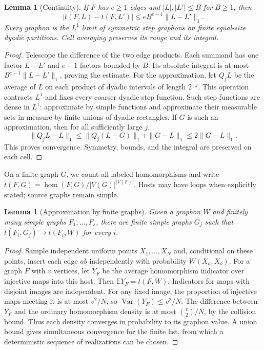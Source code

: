 \documentclass[11pt,a4paper]{article}
\newtheorem{lemma}[theorem]{Lemma}
\theoremstyle{remark}
\numberwithin{equation}{section}
\newcommand{\E}{\mathbb E}
\begin{document}
\begin{lemma}[Continuity]\label{lem:continuity}
If $F$ has $e\geq1$ edges and $|L|,|L'|\leq B$ for $B\geq1$, then
\[
 |t(F,L)-t(F,L')|\leq eB^{e-1}\|L-L'\|_1.
\]
Every graphon is the $L^1$ limit of symmetric step graphons on
finite equal-size dyadic partitions. Cell averaging preserves its
range and its integral.
\end{lemma}
\begin{proof}
Telescope the difference of the two edge products. Each summand
has one factor $L-L'$ and $e-1$ factors bounded by $B$. Its absolute
integral is at most $B^{e-1}\|L-L'\|_1$, proving the estimate.
For the approximation, let $Q_jL$ be the average of $L$ on each
product of dyadic intervals of length $2^{-j}$. This operation
contracts $L^1$ and fixes every coarser dyadic step function.
Such step functions are dense in $L^1$: approximate by simple
functions and approximate their measurable sets in measure by
finite unions of dyadic rectangles. If $G$ is such an approximation,
then for all sufficiently large $j$,
\[
 \|Q_jL-L\|_1\leq\|Q_j(L-G)\|_1+\|G-L\|_1\leq2\|G-L\|_1.
\]
This proves convergence. Symmetry, bounds, and the integral are
preserved on each cell.
\end{proof}

On a finite graph $G$, we count all labeled homomorphisms and write
$t(F,G)=\hom(F,G)/|V(G)|^{|V(F)|}$. Hosts may have loops when
explicitly stated; source graphs remain simple.

\begin{lemma}[Approximation by finite graphs]\label{lem:finite-approx}
Given a graphon $W$ and finitely many simple graphs $F_1,\ldots,F_s$,
there are finite simple graphs $G_j$ such that
$t(F_i,G_j)\to t(F_i,W)$ for every $i$.
\end{lemma}
\begin{proof}
Sample independent uniform points $X_1,\ldots,X_N$ and, conditional
on these points, insert each edge $ab$ independently with probability
$W(X_a,X_b)$. For a graph $F$ with $v$ vertices, let $Y_F$ be the
average homomorphism indicator over injective maps into this host.
Then $\E Y_F=t(F,W)$. Indicators for maps with disjoint images are
independent. For any fixed image, the proportion of injective maps
meeting it is at most $v^2/N$, so $\operatorname{Var}(Y_F)\leq v^2/N$.
The difference between $Y_F$ and the ordinary homomorphism density
is at most $\binom v2/N$, by the collision bound. Thus each density
converges in probability to its graphon value. A union bound gives
simultaneous convergence for the finite list, from which a
deterministic sequence of realizations can be chosen.
\end{proof}
\end{document}

